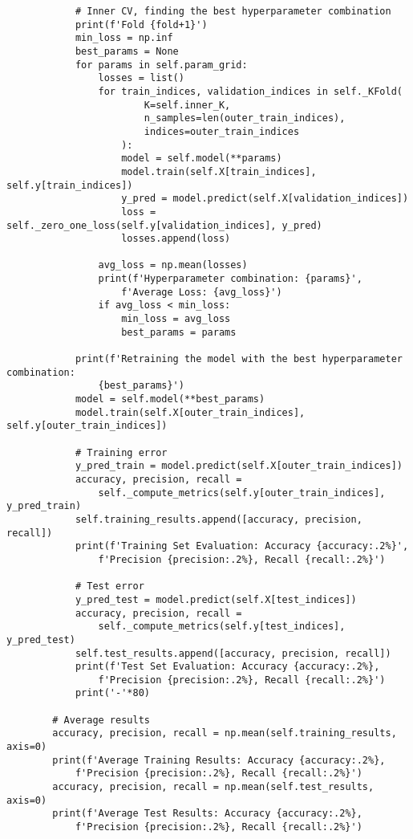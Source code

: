 \begin{verbatim}
            # Inner CV, finding the best hyperparameter combination
            print(f'Fold {fold+1}')
            min_loss = np.inf
            best_params = None
            for params in self.param_grid:
                losses = list()
                for train_indices, validation_indices in self._KFold(
                        K=self.inner_K,
                        n_samples=len(outer_train_indices), 
                        indices=outer_train_indices
                    ):
                    model = self.model(**params)
                    model.train(self.X[train_indices], self.y[train_indices])
                    y_pred = model.predict(self.X[validation_indices])
                    loss = self._zero_one_loss(self.y[validation_indices], y_pred)
                    losses.append(loss)

                avg_loss = np.mean(losses)
                print(f'Hyperparameter combination: {params}', 
                    f'Average Loss: {avg_loss}')
                if avg_loss < min_loss:
                    min_loss = avg_loss
                    best_params = params

            print(f'Retraining the model with the best hyperparameter combination:
                {best_params}')
            model = self.model(**best_params)
            model.train(self.X[outer_train_indices], self.y[outer_train_indices])

            # Training error
            y_pred_train = model.predict(self.X[outer_train_indices])
            accuracy, precision, recall = 
                self._compute_metrics(self.y[outer_train_indices], y_pred_train)
            self.training_results.append([accuracy, precision, recall])
            print(f'Training Set Evaluation: Accuracy {accuracy:.2%}', 
                f'Precision {precision:.2%}, Recall {recall:.2%}')

            # Test error
            y_pred_test = model.predict(self.X[test_indices])
            accuracy, precision, recall = 
                self._compute_metrics(self.y[test_indices], y_pred_test)
            self.test_results.append([accuracy, precision, recall])
            print(f'Test Set Evaluation: Accuracy {accuracy:.2%}, 
                f'Precision {precision:.2%}, Recall {recall:.2%}')
            print('-'*80)

        # Average results
        accuracy, precision, recall = np.mean(self.training_results, axis=0)
        print(f'Average Training Results: Accuracy {accuracy:.2%}, 
            f'Precision {precision:.2%}, Recall {recall:.2%}')
        accuracy, precision, recall = np.mean(self.test_results, axis=0)
        print(f'Average Test Results: Accuracy {accuracy:.2%}, 
            f'Precision {precision:.2%}, Recall {recall:.2%}')
\end{verbatim}


